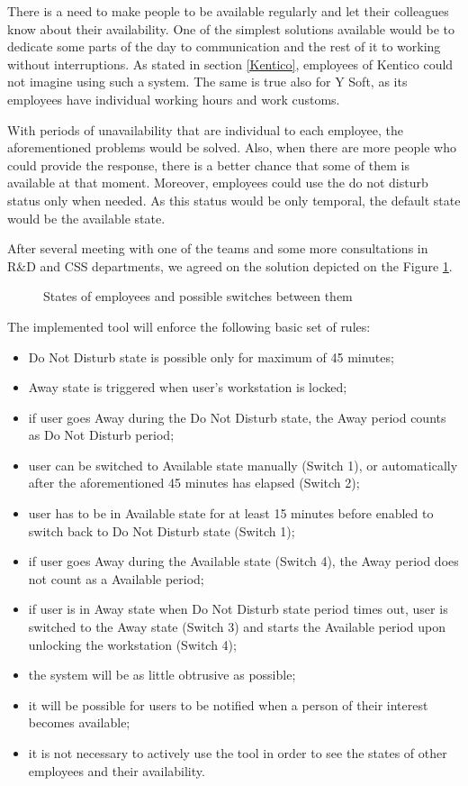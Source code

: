 \documentclass[11pt,singleside]{myfithesis2}
\newcommand{\pict}[4]{
	\begin{figure}[h!]
  		\vspace{-7px}
  		\centerline{\fcolorbox{darkgray}{palegray}{\texttt{[image: \#2]}}}
  		\caption{#1}
  		\label{#4}
	\end{figure}
}
\begin{document}
There is a need to make people to be available regularly and let their colleagues know about their availability. One of the simplest solutions available would be to dedicate some parts of the day to communication and the rest of it to working without interruptions. As stated in section \ref{Kentico}, employees of Kentico could not imagine using such a system. The same is true also for Y Soft, as its employees have individual working hours and work customs. 

With periods of unavailability that are individual to each employee, the aforementioned problems would be solved. Also, when there are more people who could provide the response, there is a better chance that some of them is available at that moment. Moreover, employees could use the do not disturb status only when needed. As this status would be only temporal, the default state would be the available state.

After several meeting with one of the teams and some more consultations in R\&D and CSS departments, we agreed on the solution depicted on the Figure \ref{pic:states}.

\pict{States of employees and possible switches between them}{data/States.png}{width=0.8\textwidth}{pic:states}

The implemented tool will enforce the following basic set of rules:
\begin{itemize}
	\item Do Not Disturb state is possible only for maximum of 45 minutes;
	\item Away state is triggered when user's workstation is locked;
	\item if user goes Away during the Do Not Disturb state, the Away period counts as Do Not Disturb period;
	\item user can be switched to Available state manually (Switch 1), or automatically after the aforementioned 45 minutes has elapsed (Switch 2);
	\item user has to be in Available state for at least 15 minutes before enabled to switch back to Do Not Disturb state (Switch 1);
	\item if user goes Away during the Available state (Switch 4), the Away period does not count as a Available period;
	\item if user is in Away state when Do Not Disturb state period times out, user is switched to the Away state (Switch 3) and starts the Available period upon unlocking the workstation (Switch 4);
	\item the system will be as little obtrusive as possible;
	\item it will be possible for users to be notified when a person of their interest becomes available;
	\item it is not necessary to actively use the tool in order to see the states of other employees and their availability.
\end{itemize}
\end{document}
